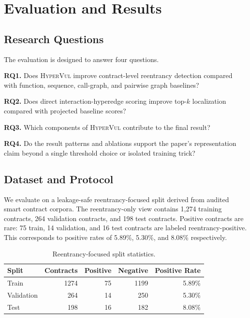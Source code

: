 \documentclass[conference]{IEEEtran}
\newcommand{\tool}{\textsc{HyperVul}}
\begin{document}
\section{Evaluation and Results}

\subsection{Research Questions}

The evaluation is designed to answer four questions.

\textbf{RQ1.} Does \tool{} improve contract-level reentrancy detection compared with function, sequence, call-graph, and pairwise graph baselines?

\textbf{RQ2.} Does direct interaction-hyperedge scoring improve top-$k$ localization compared with projected baseline scores?

\textbf{RQ3.} Which components of \tool{} contribute to the final result?

\textbf{RQ4.} Do the result patterns and ablations support the paper's representation claim beyond a single threshold choice or isolated training trick?

\subsection{Dataset and Protocol}

We evaluate on a leakage-safe reentrancy-focused split derived from audited smart contract corpora. The reentrancy-only view contains 1,274 training contracts, 264 validation contracts, and 198 test contracts. Positive contracts are rare: 75 train, 14 validation, and 16 test contracts are labeled reentrancy-positive. This corresponds to positive rates of 5.89\%, 5.30\%, and 8.08\% respectively.

\begin{table}[t]
\centering
\caption{Reentrancy-focused split statistics.}
\label{tab:dataset}
\scriptsize
\begin{tabular}{lrrrr}
\toprule
\textbf{Split} & \textbf{Contracts} & \textbf{Positive} & \textbf{Negative} & \textbf{Positive Rate} \\
\midrule
Train & 1274 & 75 & 1199 & 5.89\% \\
Validation & 264 & 14 & 250 & 5.30\% \\
Test & 198 & 16 & 182 & 8.08\% \\
\bottomrule
\end{tabular}
\end{table}
\end{document}
